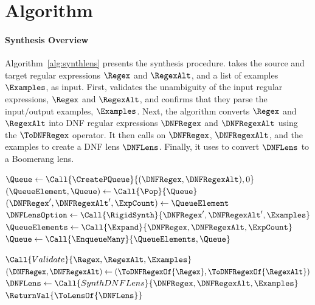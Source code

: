 \documentclass[acmsmall,screen]{acmart}
\begin{document}
\section{Algorithm}
\label{algorithm}

\paragraph*{Synthesis Overview}
Algorithm~\ref{alg:synthlens} presents the synthesis procedure.
\SynthLens{} takes the source and target regular
expressions $\Regex$ and $\RegexAlt$, and a list of examples $\Examples$, as
input. First, \SynthLens{} validates the unambiguity of the input regular
expressions, $\Regex$ and $\RegexAlt$, and confirms that they parse the
input/output examples, $\Examples$. Next, the algorithm converts
$\Regex$ and $\RegexAlt$ into DNF regular expressions
$\DNFRegex$ and $\DNFRegexAlt$
using the $\ToDNFRegex$ operator.
It then calls \SynthDNFLens{}
on $\DNFRegex$, $\DNFRegexAlt$, and the examples
to create a DNF lens $\DNFLens$.  
Finally, it uses \ToLens{} to convert $\DNFLens$ to a Boomerang lens.


\begin{algorithm}
  \caption{\SynthLens}
  \label{alg:synthlens}
  \begin{algorithmic}[1]
    \State $\Queue \gets \Call{\CreatePQueue}{(\DNFRegex,\DNFRegexAlt),0}$
    \While{$\True$}
    \State $(\QueueElement,\Queue) \gets \Call{\Pop}{\Queue}$
    \State $(\DNFRegex',\DNFRegexAlt',\ExpCount) \gets \QueueElement$
    \State $\DNFLensOption \gets
    \Call{\RigidSynth}{\DNFRegex',\DNFRegexAlt',\Examples}$
    \Switch{\DNFLensOption}
    \CaseTwo {\SomeOf{\DNFLens}}{\ReturnVal{\DNFLens}}
    \EndCaseTwo
    \Case {\None}
    \State $\QueueElements \gets \Call{\Expand}{\DNFRegex,\DNFRegexAlt,\ExpCount}$
    \State $\Queue \gets \Call{\EnqueueMany}{\QueueElements,\Queue}$
    \EndCase
    \EndSwitch
    \EndWhile
    \EndFunction
    
    \Statex
    \State $\Call{Validate}{\Regex,\RegexAlt,\Examples}$
    \State $(\DNFRegex,\DNFRegexAlt) \gets
    (\ToDNFRegexOf{\Regex},\ToDNFRegexOf{\RegexAlt})$
    \State $\DNFLens \gets \Call{SynthDNFLens}{\DNFRegex,\DNFRegexAlt,\Examples}$
    \State $\ReturnVal{\ToLensOf{\DNFLens}}$
    \EndFunction
  \end{algorithmic}
\end{algorithm}
\end{document}

